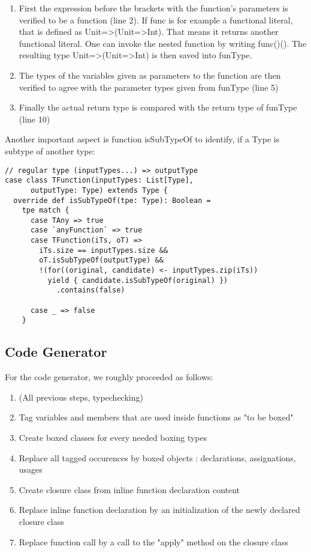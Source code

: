 \begin{enumerate}
\item First the expression before the brackets with the function's parameters is verified to be a function (line 2). If func is for example a functional literal, that is defined as Unit=>(Unit=>Int). That means it returns another functional literal. One can invoke the nested function by writing func()(). The resulting type Unit=>(Unit=>Int) is then saved into funType.
\item The types of the variables given as parameters to the function are then verified to agree with the parameter types given from funType (line 5)
\item Finally the actual return type is compared with the return type of funType (line 10)
\end{enumerate}


Another important aspect is function isSubTypeOf to identify, if a Type is subtype of another type:

\begin{lstlisting}
// regular type (inputTypes...) => outputType
case class TFunction(inputTypes: List[Type],
      outputType: Type) extends Type {
  override def isSubTypeOf(tpe: Type): Boolean =
    tpe match {
      case TAny => true
      case `anyFunction` => true
      case TFunction(iTs, oT) => 
        iTs.size == inputTypes.size && 
        oT.isSubTypeOf(outputType) && 
    	!(for((original, candidate) <- inputTypes.zip(iTs))
          yield { candidate.isSubTypeOf(original) })
            .contains(false)
    		  	
      case _ => false
    }
\end{lstlisting}

\subsection{Code Generator}
For the code generator, we roughly proceeded as follows:
\begin{enumerate}
\item (All previous steps, typechecking)
\item Tag variables and members that are used inside functions as "to be boxed"
\item Create boxed classes for every needed boxing types
\item Replace all tagged occurences by boxed objects : declarations, assignations, usages
\item Create closure class from inline function declaration content
\item Replace inline function declaration by an initialization of the newly declared closure class
\item Replace function call by a call to the "apply" method on the closure class
\end{enumerate}



